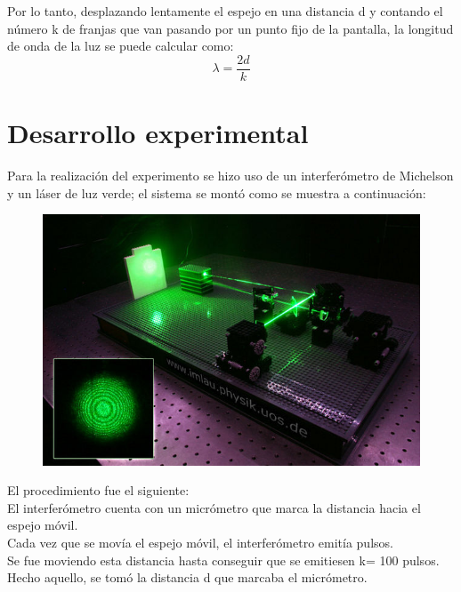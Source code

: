 \documentclass[13,twocolumn,letterpaper]{article}
\begin{document}
Por lo tanto, desplazando lentamente el espejo en una distancia d y contando el número k de franjas que van pasando por un punto fijo de la pantalla, la longitud de onda de la luz se puede calcular como: 
\[\lambda = \frac{2d}{k}\]
		
\section*{Desarrollo experimental} 
Para la realización del experimento se hizo uso de un interferómetro de Michelson y un láser de luz verde; el sistema se montó como se muestra a continuación: 
 
\begin{figure}[h]
	\centering
\includegraphics[width=\linewidth]{fig3.jpg}
\\
	\label{fig:fig3}
\end{figure}

El procedimiento fue el siguiente: \\

El interferómetro cuenta con un micrómetro que marca la distancia hacia el espejo móvil. \\

Cada vez que se movía el espejo móvil, el interferómetro emitía pulsos. \\

Se fue moviendo esta distancia hasta conseguir que se emitiesen k= 100 pulsos.\\ 

Hecho aquello, se tomó la distancia d que marcaba el micrómetro. \\
\end{document}
